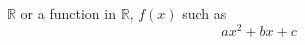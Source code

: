 \documentclass{article}
\title{}
\author{[enter_name]}
\date{}
\begin{document}
\maketitle

$\mathbb{R}$ or a function in $\mathbb{R}$, $f(x)$ such as \[ax^2+bx+c\]
\end{document}

